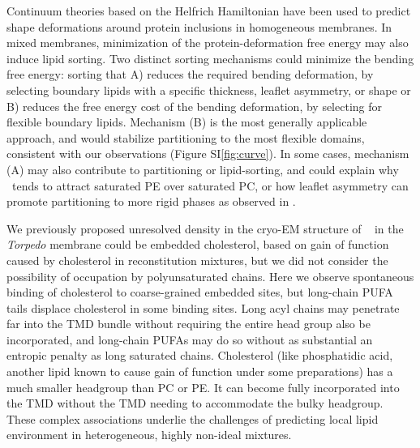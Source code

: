 Continuum theories based on the Helfrich Hamiltonian have been used to predict shape deformations around protein inclusions in homogeneous membranes.\cite{goulian1993,Aranda-Espinoza1996,Brannigan2006}  In mixed membranes, minimization of the protein-deformation free energy may also induce lipid sorting.  Two distinct sorting mechanisms could minimize the bending free energy: sorting that A) reduces the required bending deformation, by selecting boundary lipids with a specific thickness, leaflet asymmetry, or shape or B) reduces the free energy cost of the bending deformation, by selecting for flexible boundary lipids.   Mechanism (B) is the most generally applicable approach, and would stabilize partitioning to the most flexible domains, consistent with our observations (Figure SI\ref{fig:curve}).  In some cases, mechanism (A) may also contribute to partitioning or lipid-sorting, and could explain why \nachr~tends to attract saturated PE over saturated PC, or how leaflet asymmetry can promote partitioning to more rigid phases as observed in \cite{Perillo_Transbilayer_2016} . %

We previously \cite{Brannigan_Embedded_2008} proposed unresolved density in the cryo-EM structure of \nachr~ in the {\it Torpedo} membrane could be embedded cholesterol, based on gain of function caused by cholesterol in reconstitution mixtures\cite{Fong_Correlation_1986,Sunshine_Lipid_1992,Hamouda_Assessing_2006,Butler_FTIR_1993,Bhushan_Correlation_1993,Fong_Stabilization_1987,Bednarczyk_Transmembrane_2002,Corrie_Lipid_2002}, but we did not consider the possibility of occupation by polyunsaturated chains.  %
Here we observe spontaneous binding of cholesterol to coarse-grained embedded sites, but long-chain PUFA tails displace cholesterol in some binding sites. Long acyl chains may penetrate far into the TMD bundle without requiring the entire head group also be incorporated, and long-chain PUFAs may do so without as substantial an entropic penalty as long saturated chains.  Cholesterol (like phosphatidic acid, another lipid known to cause gain of function under some preparations\cite{Butler_FTIR_1993,Bhushan_Correlation_1993,Fong_Stabilization_1987,Bednarczyk_Transmembrane_2002,Corrie_Lipid_2002})  has a much smaller headgroup than PC or PE. It can become fully incorporated into the TMD without the TMD needing to accommodate the bulky headgroup.   These complex associations underlie the challenges of predicting local lipid environment in heterogeneous, highly non-ideal mixtures. 

